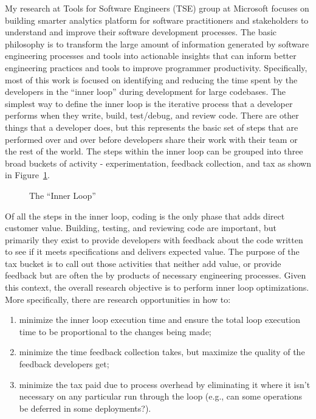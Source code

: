 \documentclass[a4paper]{article}
\begin{document}
My research at Tools for Software Engineers (TSE) group at Microsoft focuses on
building smarter analytics platform for software practitioners and stakeholders
to understand and improve their software development processes. The basic philosophy
is to transform the large amount of information generated by software engineering processes
and tools into actionable insights that can inform better engineering practices and tools to improve programmer productivity. 
Specifically, most of this work is focused on identifying and reducing the time spent by the developers in the \enquote{inner loop} during development for large codebases. The simplest way to define the inner loop is the iterative process that a developer performs when they write, build, test/debug, and review code. There are other things that a developer does, but this represents the basic set of steps that are performed over and over before developers share their work with their team or the rest of the world.
The steps within the inner loop can be grouped into three broad buckets of activity - experimentation, feedback collection, and tax as shown in Figure~\ref{fig:innerloop}. 

\begin{figure}[h]
  \centering
  
\caption{The \enquote{Inner Loop}}
  \label{fig:innerloop}
\end{figure}


Of all the steps in the inner loop, coding is the only phase that adds direct customer value. Building, testing, and reviewing code are important, but primarily they exist to provide developers with feedback about the code written to see if it meets specifications and delivers expected value.
The purpose of the tax bucket is to call out those activities that neither add value, or provide feedback but are often the by products of necessary engineering processes. %
Given this context, the overall research objective is to perform inner loop optimizations.  %
More specifically, there are research opportunities in how to:
\begin{enumerate}
\item minimize the inner loop execution time and ensure the total loop execution time to be proportional to the changes being made; 
\vspace{-5pt}\item minimize the time feedback collection takes, but maximize the quality of the feedback developers get; 
\vspace{-5pt}\item minimize the tax paid due to process overhead by eliminating it where it isn't necessary on any particular run through the loop (e.g., can some operations be deferred in some deployments?).
\end{enumerate}
\end{document}
